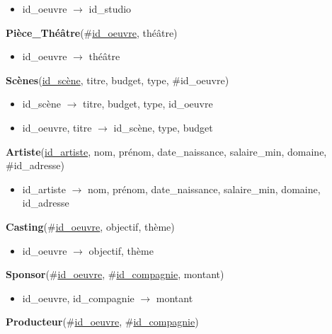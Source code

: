 \documentclass{article}
\begin{document}
\begin{itemize}
\item id\_oeuvre $\rightarrow$ id\_studio
\end{itemize}

\vspace{2mm}
\noindent
\textbf{Pièce\_Théâtre}(\#\underline{id\_oeuvre}, théâtre)

\begin{itemize}
\item id\_oeuvre $\rightarrow$ théâtre
\end{itemize}

\vspace{2mm}
\noindent
\textbf{Scènes}(\underline{id\_scène}, titre, budget, type, \#id\_oeuvre)

\begin{itemize}
\item id\_scène $\rightarrow$ titre, budget, type, id\_oeuvre
\item id\_oeuvre, titre $\rightarrow$ id\_scène, type, budget
\end{itemize}

\vspace{2mm}
\noindent
\textbf{Artiste}(\underline{id\_artiste}, nom, prénom, date\_naissance, salaire\_min, domaine, \#id\_adresse)

\begin{itemize}
\item id\_artiste $\rightarrow$ nom, prénom, date\_naissance, salaire\_min, domaine, id\_adresse
\end{itemize}

\vspace{2mm}
\noindent
\textbf{Casting}(\#\underline{id\_oeuvre}, objectif, thème)

\begin{itemize}
\item id\_oeuvre $\rightarrow$ objectif, thème
\end{itemize}

\vspace{2mm}
\noindent
\textbf{Sponsor}(\#\underline{id\_oeuvre}, \#\underline{id\_compagnie}, montant)

\begin{itemize}
\item id\_oeuvre, id\_compagnie $\rightarrow$ montant
\end{itemize}

\vspace{2mm}
\noindent
\textbf{Producteur}(\#\underline{id\_oeuvre}, \#\underline{id\_compagnie})
\end{document}

